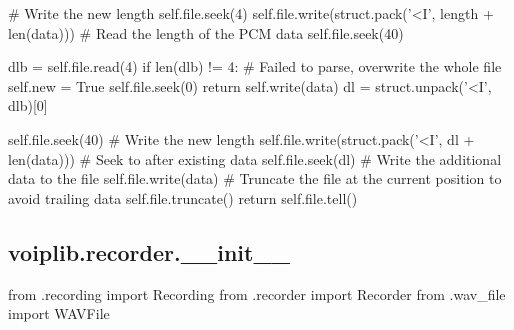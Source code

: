 \begin{pythoncode}
            # Write the new length
            self.file.seek(4)
            self.file.write(struct.pack('<I', length + len(data)))
            # Read the length of the PCM data
            self.file.seek(40)

            dlb = self.file.read(4)
            if len(dlb) != 4:
                # Failed to parse, overwrite the whole file
                self.new = True
                self.file.seek(0)
                return self.write(data)
            dl = struct.unpack('<I', dlb)[0]

            self.file.seek(40)
            # Write the new length
            self.file.write(struct.pack('<I', dl + len(data)))
            # Seek to after existing data
            self.file.seek(dl)
            # Write the additional data to the file
            self.file.write(data)
            # Truncate the file at the current position to avoid trailing data
            self.file.truncate()
            return self.file.tell()    
\end{pythoncode}
\subsection{voiplib.recorder.\_\_init\_\_}
\begin{pythoncode}
from .recording import Recording
from .recorder import Recorder
from .wav_file import WAVFile
\end{pythoncode}
